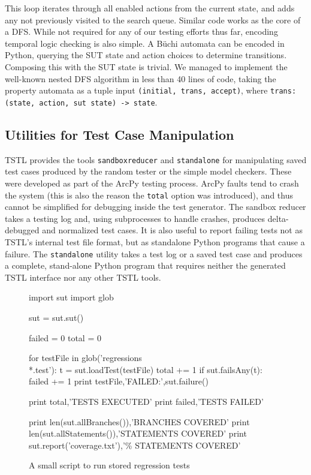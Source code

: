 This loop iterates through all enabled actions from the current state, and adds any not previously visited to the search queue.  Similar code works as the core of a DFS.  While not required for any of our testing efforts thus far, encoding temporal logic checking is also simple.  A B\"uchi automata can be encoded in Python, querying the SUT state and action choices to determine transitions.  Composing this with the SUT state is trivial.  We managed to implement the well-known nested DFS algorithm \cite{DoubleDFS} in less than 40 lines of code, taking the property automata as a tuple input {\tt(initial, trans, accept)}, where {\tt trans: (state, action, sut state) -> state}.

\subsection{Utilities for Test Case Manipulation}

TSTL provides the tools {\tt sandboxreducer} and {\tt standalone} for manipulating saved test cases produced by the random tester or the simple model checkers.  These were developed as part of the ArcPy testing process.  ArcPy faults tend to crash the system (this is also the reason the {\tt total} option was introduced), and thus cannot be simplified for debugging inside the test generator.   The sandbox reducer takes a testing log and, using subprocesses to handle crashes, produces delta-debugged and normalized test cases. It is also useful to report failing tests not as TSTL's internal test file format, but as standalone Python programs that cause a failure.  The {\tt standalone} utility takes a test log or a saved test case and produces a complete, stand-alone Python program that requires neither the generated TSTL interface nor any other TSTL tools.

\begin{figure}
{\scriptsize
\begin{code}
import sut
import glob

sut = sut.sut()

failed = 0
total = 0

for testFile in glob('regressions\\*.test'):
   t = sut.loadTest(testFile)
   total += 1
   if sut.failsAny(t):
       failed += 1
       print testFile,'FAILED:',sut.failure()

print total,'TESTS EXECUTED'
print failed,'TESTS FAILED'

print len(sut.allBranches()),'BRANCHES COVERED'
print len(sut.allStatements()),'STATEMENTS COVERED'
print sut.report('coverage.txt'),'\% STATEMENTS COVERED'
\end{code}
}
\caption{A small script to run stored regression tests}
\label{fig:regress}
\end{figure}


